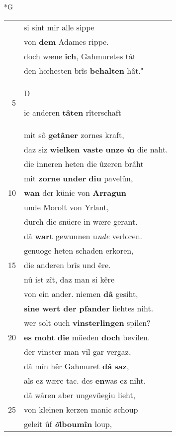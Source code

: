 \documentclass[8pt,a4paper,notitlepage]{article}
\begin{document}
\newpage
\begin{table}[ht]
\begin{minipage}[t]{0.5\linewidth}
\small
\begin{center}*G
\end{center}
\begin{tabular}{rl}
 & si sint mir alle sippe\\ 
 & von \textbf{dem} Adames rippe.\\ 
 & doch wæne \textbf{ich}, Gahmuretes tât\\ 
 & den hœhesten brîs \textbf{behalten} hât."\\ 
5 & \begin{large}D\end{large}ie anderen \textbf{tâten} rîterschaft\\ 
 & mit sô \textbf{getâner} zornes kraft,\\ 
 & daz siz \textbf{wielken vaste} \textbf{unze} \textbf{\textit{i}n} die naht.\\ 
 & die inneren heten die ûzeren brâht\\ 
 & mit \textbf{zorne} \textbf{under} \textbf{diu} pavelûn,\\ 
10 & \textbf{wan} der künic von \textbf{Arragun}\\ 
 & unde Morolt von Yrlant,\\ 
 & durch die snüere in wære gerant.\\ 
 & dâ \textbf{wart} gewunnen u\textit{nde} verloren.\\ 
 & genuoge heten schaden erkoren,\\ 
15 & die anderen brîs und êre.\\ 
 & nû ist zît, daz man si kêre\\ 
 & von ein ander. niemen \textbf{dâ} gesiht,\\ 
 & \textbf{sine wert der pfander} liehtes niht.\\ 
 & wer solt ouch \textbf{vinsterlingen} spilen?\\ 
20 & \textbf{es} \textbf{moht} \textbf{die} müeden \textbf{doch} bevilen.\\ 
 & der vinster man vil gar vergaz,\\ 
 & dâ mîn hêr Gahmuret \textbf{dâ} \textbf{saz},\\ 
 & als ez wære tac. des \textbf{en}was ez niht.\\ 
 & dâ wâren aber ungevüegiu lieht,\\ 
25 & von kleinen kerzen manic schoup\\ 
 & geleit ûf \textbf{\textit{ö}lboumîn} loup,\\ 

\end{tabular}
\end{minipage}
\end{table}
\end{document}
